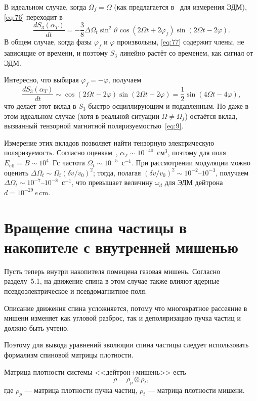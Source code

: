 \documentclass[11pt,a4paper]{article}
\begin{document}
В идеальном случае, когда $\Omega_f=\Omega$ (как предлагается
в~\cite{Orlov05} для измерения ЭДМ), \eqref{eq:76} переходит в
\begin{equation}
\frac{dS_3(\alpha_T)}{dt}
=-\frac38\Delta\Omega_t\sin^2\vartheta\cos(2\Omega t+2\varphi_f)\sin(2\Omega t-2\varphi).
\label{eq:77}
\end{equation}
В общем случае, когда фазы $\varphi_f$ и $\varphi$ произвольны,
\eqref{eq:77} содержит члены, не зависящие от времени, и поэтому $S_3$
линейно растёт со временем, как сигнал от ЭДМ.

Интересно, что выбирая $\varphi_f=-\varphi$, получаем
\begin{equation}
\frac{dS_3(\alpha_T)}{dt}
\sim\cos(2\Omega t-2\varphi)\sin(2\Omega t-2\varphi)
=\frac12\sin(4\Omega t-4\varphi),
\label{eq:78}
\end{equation}
что делает этот вклад в $S_3$ быстро осциллирующим и подавленным.
Но даже в этом идеальном случае (хотя в реальной ситуации
$\Omega\ne\Omega_f$) остаётся вклад, вызванный тензорной магнитной
поляризуемостью~\eqref{eq:9}.

Измерение этих вкладов позволяет найти тензорную электрическую
поляризуемость. Согласно оценкам~\cite{Chen98},
$\alpha_T\sim 10^{-40}$~см$^3$, поэтому для поля
$E_{\mathrm{eff}}=B\sim 10^{4}$~Гс частота
$\Omega_t\sim 10^{-5}$~с$^{-1}$. При рассмотрении модуляции можно оценить
$\Delta\Omega_t\sim\Omega_t(\delta v/v_0)^2$; тогда, полагая
$(\delta v/v_0)^2\sim 10^{-2}$--$10^{-3}$, получаем
$\Delta\Omega_t\sim 10^{-7}$--$10^{-8}$~с$^{-1}$, что превышает величину
$\omega_d$ для ЭДМ дейтрона $d=10^{-29}\,e\,\mathrm{cm}$.

\section{Вращение спина частицы в накопителе с внутренней мишенью}

Пусть теперь внутри накопителя помещена газовая мишень. Согласно
разделу~5.1, на движение спина в этом случае также влияют ядерные
псевдоэлектрическое и псевдомагнитное поля.

Описание движения спина усложняется, потому что многократное рассеяние
в мишени изменяет как угловой разброс, так и деполяризацию пучка частиц
и должно быть учтено.

Поэтому для вывода уравнений эволюции спина частицы следует использовать
формализм спиновой матрицы плотности.

Матрица плотности системы <<дейтрон+мишень>> есть
\begin{equation}
\rho=\rho_p\otimes\rho_t,
\label{eq:79}
\end{equation}
где $\rho_p$ --- матрица плотности пучка частиц, $\rho_t$ --- матрица
плотности мишени.
\end{document}
